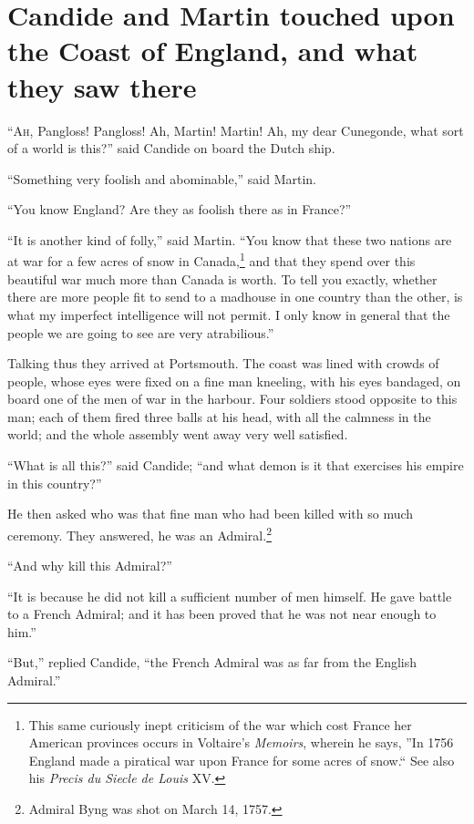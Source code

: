 \chapter{Candide and Martin touched upon the Coast of England, and what they saw there}
\lettrine[lraise=0.1,nindent=0em,slope=-.5em]{``A}{h}, Pangloss! Pangloss! Ah, Martin! Martin! Ah, my dear Cunegonde, what sort of a world is this?'' said Candide on board the Dutch ship.

``Something very foolish and abominable,'' said Martin.

``You know England? Are they as foolish there as in France?''

``It is another kind of folly,'' said Martin. ``You know that these two nations are at war for a few acres of snow in Canada,\footnote{This same curiously inept criticism of the war which cost France her American provinces occurs in Voltaire's \textit{Memoirs}, wherein he says, ''In 1756 England made a piratical war upon France for some acres of snow.`` See also his \textit{Precis du Siecle de Louis} XV.} and that they spend over this beautiful war much more than Canada is worth. To tell you exactly, whether there are more people fit to send to a madhouse in one country than the other, is what my imperfect intelligence will not permit. I only know in general that the people we are going to see are very atrabilious.''

Talking thus they arrived at Portsmouth. The coast was lined with crowds of people, whose eyes were fixed on a fine man kneeling, with his eyes bandaged, on board one of the men of war in the harbour. Four soldiers stood opposite to this man; each of them fired three balls at his head, with all the calmness in the world; and the whole assembly went away very well satisfied.

``What is all this?'' said Candide; ``and what demon is it that exercises his empire in this country?''

He then asked who was that fine man who had been killed with so much ceremony. They answered, he was an Admiral.\footnote{Admiral Byng was shot on March 14, 1757.}

``And why kill this Admiral?''

``It is because he did not kill a sufficient number of men himself. He gave battle to a French Admiral; and it has been proved that he was not near enough to him.''

``But,'' replied Candide, ``the French Admiral was as far from the English Admiral.''

